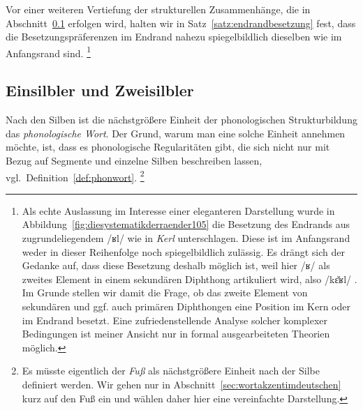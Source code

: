 Vor einer weiteren Vertiefung der strukturellen Zusammenhänge, die in Abschnitt~\ref{sec:einsilblerundzweisilbler} erfolgen wird, halten wir in Satz~\ref{satz:endrandbesetzung} fest, dass die Besetzungspräferenzen im Endrand nahezu spiegelbildlich dieselben wie im Anfangsrand sind.%
\footnote{Als echte Auslassung im Interesse einer eleganteren Darstellung wurde in Abbildung~\ref{fig:diesystematikderraender105} die Besetzung des Endrands aus zugrundeliegendem /ʁl/ wie in \textit{Kerl} unterschlagen.
Diese ist im Anfangsrand weder in dieser Reihenfolge noch spiegelbildlich zulässig.
Es drängt sich der Gedanke auf, dass diese Besetzung deshalb möglich ist, weil hier /ʁ/ als zweites Element in einem sekundären Diphthong artikuliert wird, also /kɛ̆ʁl/ \phopro [kɛ͡əl].
Im Grunde stellen wir damit die Frage, ob das zweite Element von sekundären und ggf. auch primären Diphthongen eine Position im Kern oder im Endrand besetzt.
Eine zufriedenstellende Analyse solcher komplexer Bedingungen ist meiner Ansicht nur in formal ausgearbeiteten Theorien möglich.}

\Stretch[0.5]


\subsection{Einsilbler und Zweisilbler}
\label{sec:einsilblerundzweisilbler}


Nach den Silben ist die nächstgrößere Einheit der phonologischen Strukturbildung das \textit{phonologische Wort}.
Der Grund, warum man eine solche Einheit annehmen möchte, ist, dass es phonologische Regularitäten gibt, die sich nicht nur mit Bezug auf Segmente und einzelne Silben beschreiben lassen, vgl.\ Definition~\ref{def:phonwort}.%
\footnote{Es müsste eigentlich der \textit{Fuß} als nächstgrößere Einheit nach der Silbe definiert werden.
Wir gehen nur in Abschnitt~\ref{sec:wortakzentimdeutschen} kurz auf den Fuß ein und wählen daher hier eine vereinfachte Darstellung.}

\Stretch[0.5]

